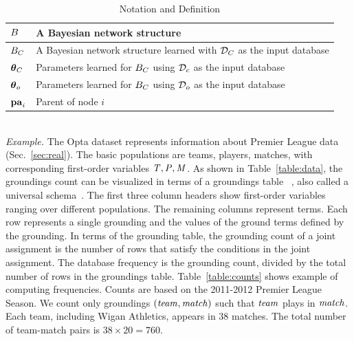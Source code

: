 {{\begin{table}
{\begin{tabular}{|l|l|}
 	 	      			$B$&A Bayesian network structure\\\hline
 	 	      			$B_{C}$ & A Bayesian network structure learned with $\mathcal{D}_{C}$ as the input database\\\hline
 	 	      			$\boldsymbol{\theta}_{C}$ & Parameters learned for $B_{C}$ using $\mathcal{D}_{c}$  as the input database\\\hline
 	 	      			$\boldsymbol{\theta}_{o}$ & Parameters learned for $B_{C}$ using $\mathcal{D}_{o}$  as the input database\\\hline
 	 	      			$\mathbf{pa}_{i}$&Parent of node $i$\\\hline
 	 	      		\end{tabular}} 	\caption[Table of Notations]{Notation and Definition	\label{table:notation}}
 	 	      	\end{table}\\
\emph{Example.} \label{sec:example}
%
The Opta dataset represents information about Premier League data %
(Sec.~\ref{sec:real}). 
The basic populations are teams, players, matches, with 
corresponding first-order variables $\it{T}, \it{P}, \it{M}$. As shown in Table~\ref{table:data}, the groundings count can be visualized in terms of a groundings table ~\citep{Schulte2012}, also called a universal schema~\citep{Riedel2013}. 
The first three column headers show first-order variables ranging over different populations. The remaining columns represent terms. Each row represents a single grounding and the values of the ground terms defined by the grounding.
In terms of the grounding table, the grounding count of a joint assignment is the number of rows that satisfy the conditions in the joint assignment. The database frequency is the grounding count, divided by the total number of rows in the groundings table. Table~\ref{table:counts} shows example of computing frequencies. Counts are based on the 2011-2012 Premier League Season. We count only groundings $(\it{team},\it{match})$ such that $\it{team}$ plays in $\it{match}$. Each team, including Wigan Athletics, appears in 38 matches. The total number of team-match pairs is $38 \times 20 = 760$.

}}
